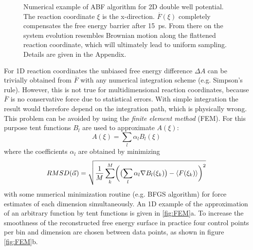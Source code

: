 \begin{figure}[H]
    \centering
    \vspace{-1cm}
    \caption{Numerical example of ABF algorithm for 2D double well potential. The reaction coordinate $\xi$ is the x-direction. $\overline{F}(\xi)$ completely compensates the free energy barrier after 15~ps. From there on the system evolution resembles Brownian motion along the flattened reaction coordinate, which will ultimately lead to uniform sampling. Details are given in the Appendix.}
\label{fig:ABF}%
\end{figure}

For 1D reaction coordinates the unbiased free energy difference $\Delta A$ can be trivially obtained from $\overline{F}$ with any numerical integration scheme (e.g. Simpson's rule).
However, this is not true for multidimensional reaction coordinates, because $\overline{F}$ is no conservative force due to statistical errors. With simple integration the result would therefore depend on the integration path, which is physically wrong. This problem can be avoided by using the \textit{finite element method} (FEM). For this purpose tent functions $B_l$ are used to approximate $A(\xi)$:\autocite{darve2008adaptive}
\begin{equation}
  A(\xi) = \sum_l \alpha_l B_l(\xi)
\end{equation}
where the coefficients $\alpha_l$ are obtained by minimizing
\begin{equation}
  RMSD(\vec{\alpha})=\sqrt{\frac{1}{M}\sum_k^M\biggl(\bigl(\sum_l \alpha_l \nabla B_l(\xi_k)\bigr) - \braket{F(\xi_k)} \biggr)^2}
\end{equation}
with some numerical minimization routine (e.g. BFGS algorithm\autocite{nocedal2006numerical}) for force estimates of each dimension simultaneously. An 1D example of the approximation of an arbitrary function by tent functions is given in \ref{fig:FEM}a. To increase the smoothness of the reconstructed free energy surface in practice four control points per bin and dimension are chosen between data points, as shown in figure \ref{fig:FEM}b.

